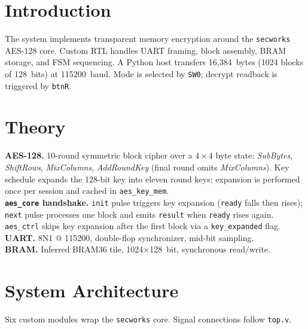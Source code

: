 \documentclass[11pt,a4paper]{article}
\begin{document}
\section{Introduction}
The system implements transparent memory encryption around the
\texttt{secworks} AES-128 core. Custom RTL handles UART framing, block
assembly, BRAM storage, and FSM sequencing. A Python host transfers
16{,}384~bytes (1024 blocks of 128~bits) at 115200~baud. Mode is
selected by \texttt{SW0}; decrypt readback is triggered by \texttt{btnR}.

\section{Theory}
\textbf{AES-128.} 10-round symmetric block cipher over a $4{\times}4$
byte state: \textit{SubBytes}, \textit{ShiftRows}, \textit{MixColumns},
\textit{AddRoundKey} (final round omits \textit{MixColumns}).
Key schedule expands the 128-bit key into eleven round keys; expansion
is performed once per session and cached in \texttt{aes\_key\_mem}.\\
\textbf{\texttt{aes\_core} handshake.} \texttt{init} pulse triggers key
expansion (\texttt{ready} falls then rises); \texttt{next} pulse
processes one block and emits \texttt{result} when \texttt{ready} rises
again. \texttt{aes\_ctrl} skips key expansion after the first block via
a \texttt{key\_expanded} flag.\\
\textbf{UART.} 8N1 @ 115200, double-flop synchronizer, mid-bit
sampling.\\
\textbf{BRAM.} Inferred BRAM36 tile, 1024$\times$128~bit, synchronous
read/write.

\section{System Architecture}
Six custom modules wrap the \texttt{secworks} core. Signal connections
follow \texttt{top.v}.
\end{document}
